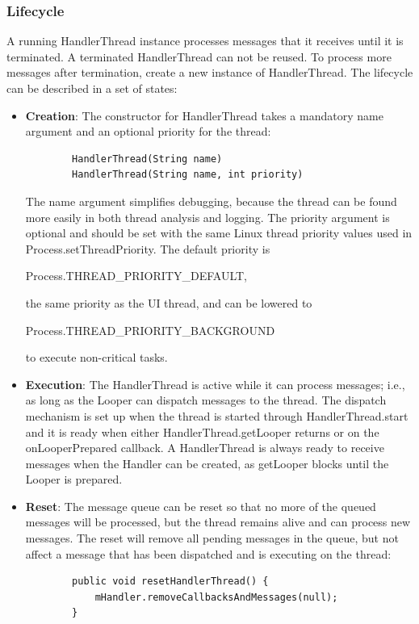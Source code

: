 \subsubsection{Lifecycle}
A running HandlerThread instance processes messages that it receives until it is terminated. A terminated HandlerThread can not be reused. To process more messages after termination, create a new instance of HandlerThread. The lifecycle can be described in a set of states:
\begin{itemize}
	\item \textbf{Creation}: The constructor for HandlerThread takes a mandatory name argument and an optional priority for the thread:
	\begin{lstlisting}
		HandlerThread(String name)
		HandlerThread(String name, int priority)
	\end{lstlisting}
	The name argument simplifies debugging, because the thread can be found more easily in both thread analysis and logging. The priority argument is optional and should be set with the same Linux thread priority values used in Process.setThreadPriority. The default priority is
	\begin{center}
		Process.THREAD\_PRIORITY\_DEFAULT,
	\end{center}
	the same priority as the UI thread, and can be lowered to
	\begin{center}
		Process.THREAD\_PRIORITY\_BACKGROUND
	\end{center}
	to execute non-critical tasks.
	\item \textbf{Execution}: The HandlerThread is active while it can process messages; i.e., as long as the Looper can dispatch messages to the thread. The dispatch mechanism is set up when the thread is started through HandlerThread.start and it is ready when either HandlerThread.getLooper returns or on the onLooperPrepared callback. A HandlerThread is always ready to receive messages when the Handler can be created, as getLooper blocks until the Looper is prepared.
	\item \textbf{Reset}: The message queue can be reset so that no more of the queued messages will be processed, but the thread remains alive and can process new messages. The reset will remove all pending messages in the queue, but not affect a message that has been dispatched and is executing on the thread:
	\begin{lstlisting}
		public void resetHandlerThread() {
			mHandler.removeCallbacksAndMessages(null);
		}
	\end{lstlisting}

\end{itemize}
